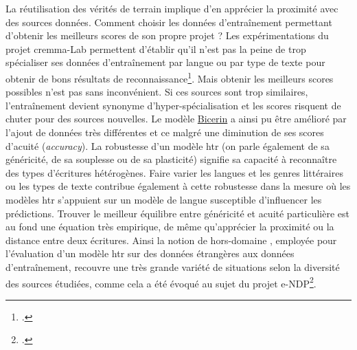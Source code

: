 \documentclass[a4paper,12pt,twoside]{book}
\begin{document}
				La réutilisation des vérités de terrain implique d'en apprécier la
				proximité avec des sources données. Comment choisir les données
				d'entraînement permettant d'obtenir les meilleurs scores de son propre
				projet ? Les expérimentations du projet \gls{cremma}-Lab permettent d'établir
				qu'il n'est pas la peine de trop spécialiser ses données d'entraînement
				par langue ou par type de texte pour obtenir de bons résultats de
				reconnaissance\footcite{campsCremmaLabProjectsTranscription2022}. Mais
				obtenir les meilleurs scores possibles n'est pas sans inconvénient. Si
				ces sources sont trop similaires, l'entraînement devient synonyme
				d'hyper-spécialisation et les scores risquent de chuter pour des sources
				nouvelles. Le modèle
				\href{https://github.com/HTR-United/cremma-medieval/releases/tag/1.1.0}{Bicerin}
				a ainsi pu être \og amélioré \fg{}  par l'ajout de données très différentes et
				ce malgré une diminution de ses scores d'acuité (\textit{accuracy}). La
				robustesse d'un modèle \gls{htr} (on parle également de sa généricité, de sa
				souplesse ou de sa plasticité) signifie sa capacité à reconnaître des
				types d'écritures hétérogènes. Faire varier les langues et les genres
				littéraires ou les types de texte contribue également à cette robustesse
				dans la mesure où les modèles \gls{htr} s'appuient sur un modèle de langue
				susceptible d'influencer les \glspl{prédiction}. Trouver le meilleur équilibre
				entre généricité et acuité particulière est au fond une équation très
				empirique, de même qu'apprécier la proximité ou la distance entre deux
				écritures. Ainsi la notion de \og hors-domaine \fg{} , employée pour
				l'évaluation d'un modèle \gls{htr} sur des données étrangères aux données
				d'entraînement, recouvre une très grande variété de situations selon la
				diversité des sources étudiées, comme cela a été évoqué au sujet du
				projet e-NDP\footcite{torresaguilarModelisationAffinageHTR2022}.
				
\end{document}
